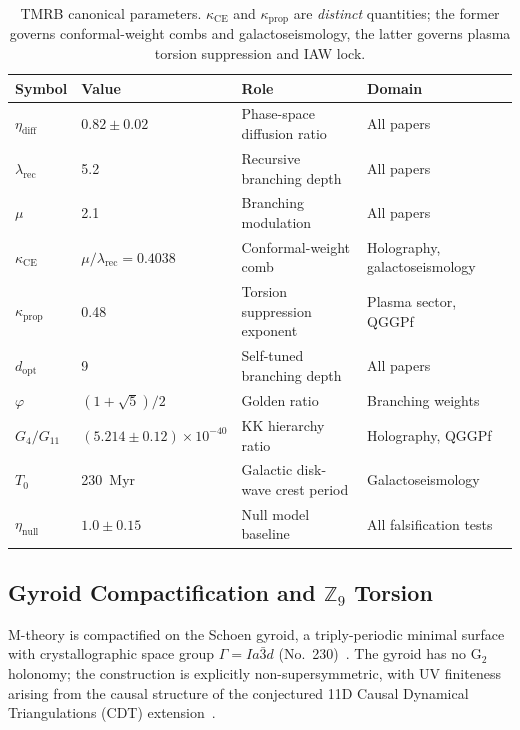 \documentclass[11pt,a4paper]{article}
\begin{document}
\begin{table}[ht]
\centering
\caption{TMRB canonical parameters. $\kappa_{\mathrm{CE}}$ and $\kappa_{\mathrm{prop}}$
are \emph{distinct} quantities; the former governs conformal-weight combs and
galactoseismology, the latter governs plasma torsion suppression and IAW lock.}
\label{tab:params}
\begin{tabular}{llp{4.0cm}l}
\toprule
Symbol & Value & Role & Domain \\
\midrule
$\eta_{\mathrm{diff}}$ & $0.82\pm0.02$ & Phase-space diffusion ratio & All papers \\
$\lambda_{\mathrm{rec}}$ & 5.2 & Recursive branching depth & All papers \\
$\mu$ & 2.1 & Branching modulation & All papers \\
$\kappa_{\mathrm{CE}}$ & $\mu/\lambda_{\mathrm{rec}} = 0.4038$ & Conformal-weight comb & Holography, galactoseismology \\
$\kappa_{\mathrm{prop}}$ & 0.48 & Torsion suppression exponent & Plasma sector, QGGPf \\
$d_{\mathrm{opt}}$ & 9 & Self-tuned branching depth & All papers \\
$\varphi$ & $(1+\sqrt{5})/2$ & Golden ratio & Branching weights \\
$G_4/G_{11}$ & $(5.214\pm0.12)\times10^{-40}$ & KK hierarchy ratio & Holography, QGGPf \\
$T_0$ & 230~Myr & Galactic disk-wave crest period & Galactoseismology \\
$\eta_{\mathrm{null}}$ & $1.0\pm0.15$ & Null model baseline & All falsification tests \\
\bottomrule
\end{tabular}
\end{table}

\subsection{Gyroid Compactification and $\mathbb{Z}_9$ Torsion}

M-theory is compactified on the Schoen gyroid, a triply-periodic minimal surface
with crystallographic space group $\Gamma = Ia\bar{3}d$ (No.~230)~\cite{Schoen1970}.
The gyroid has no G$_2$ holonomy; the construction is explicitly
non-supersymmetric, with UV finiteness arising from the causal structure of the
conjectured 11D Causal Dynamical Triangulations (CDT) extension~\cite{AJL2004,AJL2005}.
\end{document}
